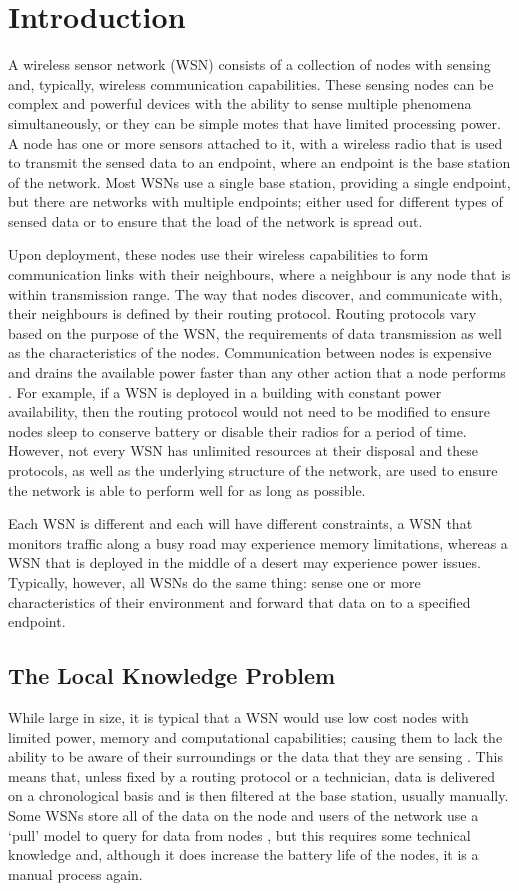 \chapter{Introduction}
A wireless sensor network (WSN) consists of a collection of nodes with sensing and, typically, wireless communication capabilities. These sensing nodes can be complex and powerful devices with the ability to sense multiple phenomena simultaneously, or they can be simple motes that have limited processing power. A node has one or more sensors attached to it, with a wireless radio that is used to transmit the sensed data to an endpoint, where an endpoint is the base station of the network. Most WSNs use a single base station, providing a single endpoint, but there are networks with multiple endpoints; either used for different types of sensed data or to ensure that the load of the network is spread out.

Upon deployment, these nodes use their wireless capabilities to form communication links with their neighbours, where a neighbour is any node that is within transmission range. The way that nodes discover, and communicate with, their neighbours is defined by their routing protocol. Routing protocols vary based on the purpose of the WSN, the requirements of data transmission as well as the characteristics of the nodes. Communication between nodes is expensive and drains the available power faster than any other action that a node performs \cite{Raghunathan2002}. For example, if a WSN is deployed in a building with constant power availability, then the routing protocol would not need to be modified to ensure nodes sleep to conserve battery or disable their radios for a period of time. However, not every WSN has unlimited resources at their disposal and these protocols, as well as the underlying structure of the network, are used to ensure the network is able to perform well for as long as possible.

Each WSN is different and each will have different constraints, a WSN that monitors traffic along a busy road may experience memory limitations, whereas a  WSN that is deployed in the middle of a desert may experience power issues. Typically, however, all WSNs do the same thing: sense one or more characteristics of their environment and forward that data on to a specified endpoint.

\section{The Local Knowledge Problem}
While large in size, it is typical that a WSN would use low cost nodes with limited power, memory and computational capabilities; causing them to lack the ability to be aware of their surroundings or the data that they are sensing \cite{Akyildiz2002}. This means that, unless fixed by a routing protocol or a technician, data is delivered on a chronological basis and is then filtered at the base station, usually manually. Some WSNs store all of the data on the node and users of the network use a `pull' model to query for data from nodes \cite{Sadagopan}, but this requires some technical knowledge and, although it does increase the battery life of the nodes, it is a manual process again.

